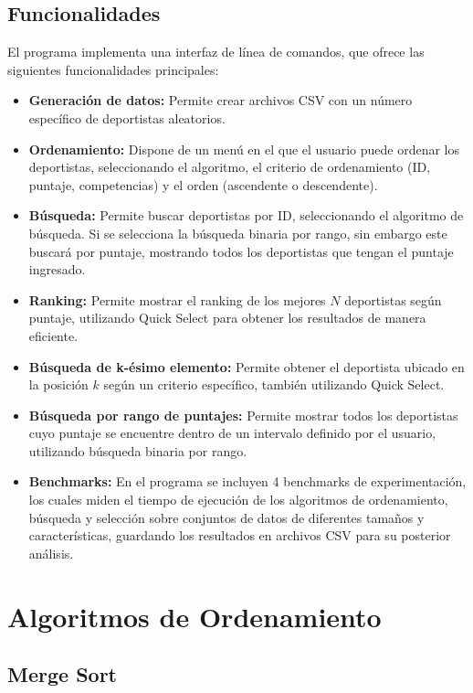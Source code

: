 \subsection{Funcionalidades}
El programa implementa una interfaz de línea de comandos, que ofrece las siguientes funcionalidades principales:
\begin{itemize}
    \item \textbf{Generación de datos:} Permite crear archivos CSV con un número específico de deportistas aleatorios.
    \item \textbf{Ordenamiento:} Dispone de un menú en el que el usuario puede ordenar los deportistas, seleccionando el algoritmo, el criterio de ordenamiento (ID, puntaje, competencias) y el orden (ascendente o descendente).
    \item \textbf{Búsqueda:} Permite buscar deportistas por ID, seleccionando el algoritmo de búsqueda. Si se selecciona la búsqueda binaria por rango, sin embargo este buscará por puntaje, mostrando todos los deportistas que tengan el puntaje ingresado.
    \item \textbf{Ranking:} Permite mostrar el ranking de los mejores \(N\) deportistas según puntaje, utilizando Quick Select para obtener los resultados de manera eficiente.
    \item \textbf{Búsqueda de k-ésimo elemento:} Permite obtener el deportista ubicado en la posición \(k\) según un criterio específico, también utilizando Quick Select.
    \item \textbf{Búsqueda por rango de puntajes:} Permite mostrar todos los deportistas cuyo puntaje se encuentre dentro de un intervalo definido por el usuario, utilizando búsqueda binaria por rango.
    \item \textbf{Benchmarks:} En el programa se incluyen 4 benchmarks de experimentación, los cuales miden el tiempo de ejecución de los algoritmos de ordenamiento, búsqueda y selección sobre conjuntos de datos de diferentes tamaños y características, guardando los resultados en archivos CSV para su posterior análisis.
\end{itemize}

\section{Algoritmos de Ordenamiento}

\subsection{Merge Sort}

